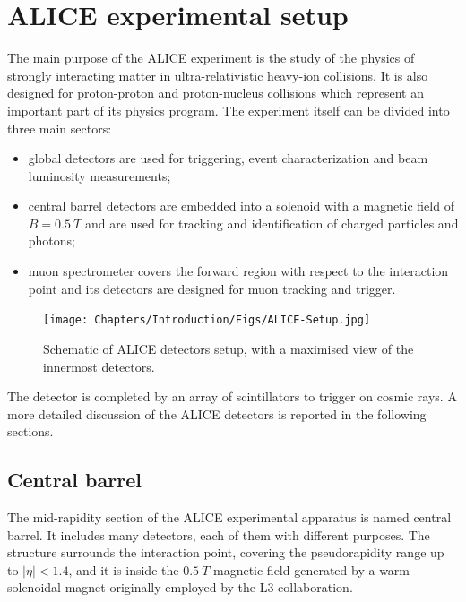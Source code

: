\section{ALICE experimental setup} %
The main purpose of the ALICE experiment is the study of the physics of strongly interacting matter in ultra-relativistic heavy-ion collisions. It is also designed for proton-proton and proton-nucleus collisions which represent an important part of its physics program. The experiment itself can be divided into three main sectors:
\begin{itemize}
    \item global detectors are used for triggering, event characterization and beam luminosity measurements;
    \item central barrel detectors are embedded into a solenoid with a magnetic field of $B = 0.5\ T$ and are used for tracking and identification of charged particles and photons;
    \item muon spectrometer covers the forward region with respect to the interaction point and its detectors are designed for muon tracking and trigger.
\end{itemize}

\begin{figure}[!t]
\begin{center}
\texttt{[image: Chapters/Introduction/Figs/ALICE-Setup.jpg]}
\caption{Schematic of ALICE detectors setup, with a maximised view of the innermost detectors.}
\label{fig:ALICEsetup}
\end{center}
\end{figure}

The detector is completed by an array of scintillators to trigger on cosmic rays.
A more detailed discussion of the ALICE detectors is reported in the following sections.

\subsection{Central barrel}
The mid-rapidity section of the ALICE experimental apparatus is named central barrel.
It includes many detectors, each of them with different purposes.
The structure surrounds the interaction point, covering the pseudorapidity range up to $|\eta| < 1.4$, and it is inside the $0.5\ T$ magnetic field generated by a warm solenoidal magnet originally employed by the L3 collaboration.

